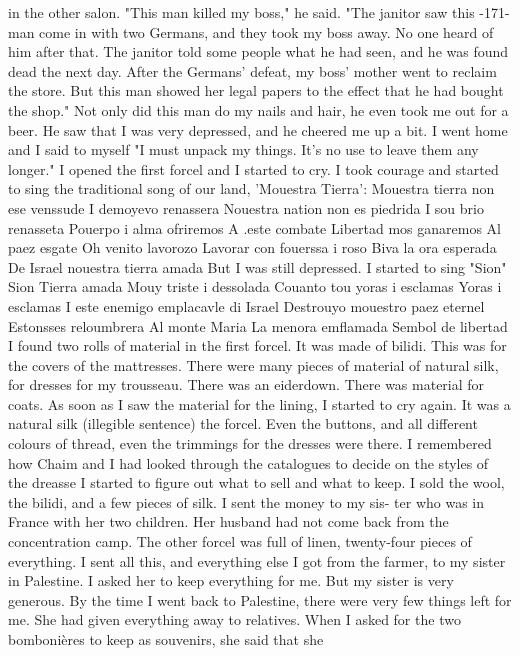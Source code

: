 in the other salon. 
"This man killed my boss," he said. "The janitor saw this 
-171- 
man come in with two Germans, and they took my boss away. No one heard 
of him after that. The janitor told some people what he had seen, and 
he was found dead the next day. After the Germans' defeat, my boss' mother went to reclaim the store. But this man showed her legal papers to 
the effect that he had bought the shop." 
Not only did this man do my nails and hair, he even took me out for 
a beer. He saw that I was very depressed, and he cheered me up a bit. 
I went home and I said to myself "I must unpack my things. It's no use 
to leave them any longer." I opened the first forcel and I started to 
cry. I took courage and started to sing the traditional song of our 
land, 'Mouestra Tierra': 
Mouestra tierra non ese venssude 
I demoyevo renassera 
Nouestra nation non es piedrida 
I sou brio renasseta 
Pouerpo i alma ofriremos 
A .este combate 
Libertad mos ganaremos 
Al paez esgate 
Oh venito lavorozo 
Lavorar con fouerssa i roso 
Biva la ora esperada 
De Israel nouestra tierra amada 
But I was still depressed. I started to sing "Sion" 
Sion Tierra amada 
Mouy triste i dessolada 
Couanto tou yoras i esclamas 
Yoras i esclamas 
I este enemigo emplacavle di Israel 
Destrouyo mouestro paez eternel 
Estonsses reloumbrera 
Al monte Maria 
La menora emflamada 
Sembol de libertad 
I found two rolls of material in the first forcel. It was made of 
bilidi. This was for the covers of the mattresses. There were many 
pieces of material of natural silk, for dresses for my trousseau. There 
was an eiderdown. There was material for coats. As soon as I saw the 
material for the lining, I started to cry again. It was a natural silk 
(illegible sentence)
the forcel. Even the buttons, and all different colours of thread, even 
the trimmings for the dresses were there. I remembered how Chaim and I 
had looked through the catalogues to decide on the styles of the dreasse 
I started to figure out what to sell and what to keep. I sold the 
wool, the bilidi, and a few pieces of silk. I sent the money to my sis-
ter who was in France with her two children. Her husband had not come 
back from the concentration camp. 
The other forcel was full of linen, twenty-four pieces of everything.
I sent all this, and everything else I got from the farmer, to my sister 
in Palestine. I asked her to keep everything for me. But my sister is 
very generous. By the time I went back to Palestine, there were very few 
things left for me. She had given everything away to relatives. When 
I asked for the two bombonières to keep as souvenirs, she said that she 
